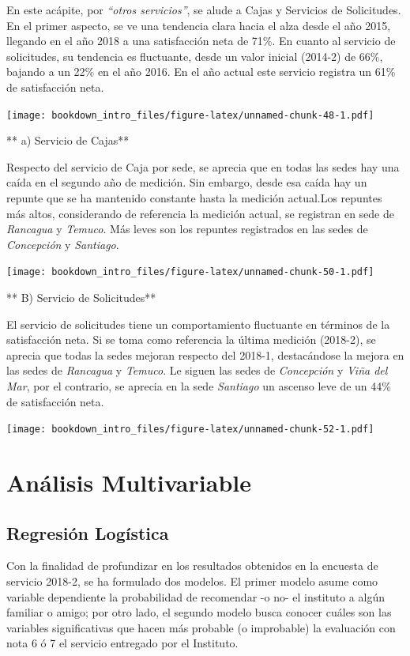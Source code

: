 \documentclass[]{book}
\begin{document}
En este acápite, por \emph{``otros servicios''}, se alude a Cajas y
Servicios de Solicitudes. En el primer aspecto, se ve una tendencia
clara hacia el alza desde el año 2015, llegando en el año 2018 a una
satisfacción neta de 71\%. En cuanto al servicio de solicitudes, su
tendencia es fluctuante, desde un valor inicial (2014-2) de 66\%,
bajando a un 22\% en el año 2016. En el año actual este servicio
registra un 61\% de satisfacción neta.

\texttt{[image: bookdown\_intro\_files/figure-latex/unnamed-chunk-48-1.pdf]}

** a) Servicio de Cajas**

Respecto del servicio de Caja por sede, se aprecia que en todas las
sedes hay una caída en el segundo año de medición. Sin embargo, desde
esa caída hay un repunte que se ha mantenido constante hasta la medición
actual.Los repuntes más altos, considerando de referencia la medición
actual, se registran en sede de \emph{Rancagua} y \emph{Temuco}. Más
leves son los repuntes registrados en las sedes de \emph{Concepción} y
\emph{Santiago}.

\texttt{[image: bookdown\_intro\_files/figure-latex/unnamed-chunk-50-1.pdf]}

** B) Servicio de Solicitudes**

El servicio de solicitudes tiene un comportamiento fluctuante en
términos de la satisfacción neta. Si se toma como referencia la última
medición (2018-2), se aprecia que todas la sedes mejoran respecto del
2018-1, destacándose la mejora en las sedes de \emph{Rancagua} y
\emph{Temuco}. Le siguen las sedes de \emph{Concepción} y \emph{Viña del
Mar}, por el contrario, se aprecia en la sede \emph{Santiago} un ascenso
leve de un 44\% de satisfacción neta.

\texttt{[image: bookdown\_intro\_files/figure-latex/unnamed-chunk-52-1.pdf]}

\chapter{Análisis Multivariable}\label{analisis-multivariable}

\section{Regresión Logística}\label{regresion-logistica}

Con la finalidad de profundizar en los resultados obtenidos en la
encuesta de servicio 2018-2, se ha formulado dos modelos. El primer
modelo asume como variable dependiente la probabilidad de recomendar -o
no- el instituto a algún familiar o amigo; por otro lado, el segundo
modelo busca conocer cuáles son las variables significativas que hacen
más probable (o improbable) la evaluación con nota 6 ó 7 el servicio
entregado por el Instituto.
\end{document}

